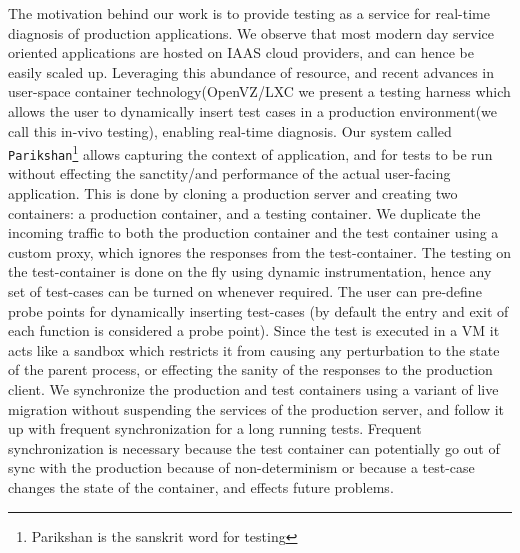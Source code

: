The motivation behind our work is to provide testing as a service for real-time diagnosis of production applications.
We observe that most modern day service oriented applications are hosted on IAAS cloud providers, and can hence be easily scaled  up. 
Leveraging this abundance of resource, and recent advances in user-space container technology(OpenVZ/LXC\cite{OpenVZ,LXC} we present a testing harness which allows the user to dynamically insert test cases in a production environment(we call this in-vivo testing), enabling real-time diagnosis.
Our system called \texttt{Parikshan}\footnote{Parikshan is the sanskrit word for testing} allows capturing the context of application, and for tests to be run without effecting the sanctity/and performance of the actual user-facing application. 
This is done by cloning a production server and creating two containers: a production container, and a testing container. 
We duplicate the incoming traffic to both the production container and the test container using a custom proxy, which ignores the responses from the test-container. 
The testing on the test-container is done on the fly using dynamic instrumentation, hence any set of test-cases can be turned on whenever required. 
The user can pre-define probe points for dynamically inserting test-cases (by default the entry and exit of each function is considered a probe point).
Since the test is executed in a VM it acts like a sandbox which restricts it from causing any perturbation to the state of the parent process, or effecting the sanity of the responses to the production client. 
We synchronize the production and test containers using a variant of live migration without suspending the services of the production server, and follow it up with frequent synchronization for a long running tests. 
Frequent synchronization is necessary because the test container can potentially go out of sync with the production because of non-determinism or because a test-case changes the state of the container, and effects future problems. 


